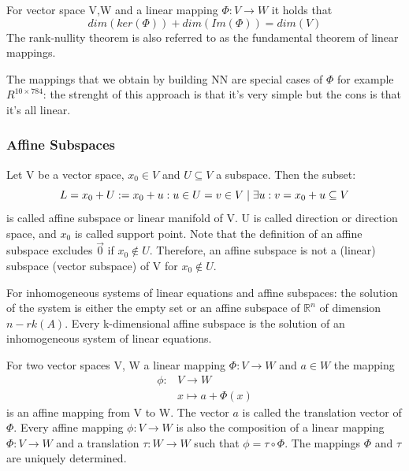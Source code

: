 \begin{theorem}
    For vector space V,W and a linear mapping $ \Phi: V \rightarrow W  $ it holds that \[ 
        dim(ker(\Phi)) + dim(Im(\Phi)) = dim(V)
    \]
    The rank-nullity theorem is also referred to as the fundamental theorem of linear mappings.
\end{theorem}
The mappings that we obtain by building NN are special cases of $ \Phi $ for example $ R^{10\times784} $: the strenght of this approach is that it's very simple but the cons is that it's all linear.
\subsubsection*{Affine Subspaces}
\begin{definition}
    Let V be a vector space, $x_0 \in V$ and $U \subseteq V$ a subspace. Then the subset: \[ 
        L = x_0 + U : = {x_0+u: u\in U} \\
        ={v\in V \mid \exists u : v = x_0 +u} \subseteq V
    \]is called affine subspace or linear manifold of V. U is called direction or direction space, and $x_0$ is called support point. Note that the definition of an affine subspace excludes $\vec{0}$ if $x_0 \notin U$. Therefore, an affine subspace is not a (linear) subspace (vector subspace) of V for $x_0 \notin U$.
\end{definition}
\begin{remark}
    For inhomogeneous systems of linear equations and affine subspaces:
    the solution of the system is either the empty set or an affine subspace of $\mathbb{R}^n$ of dimension $n-rk(A)$. Every k-dimensional affine subspace is the solution of an inhomogeneous system of linear equations. 
\end{remark}
\begin{definition}
    For two vector spaces V, W a linear mapping $\Phi: V \longrightarrow W$ and $a \in W$ the mapping
    \begin{align*}
        \phi: &V \longrightarrow W \\
        &x \mapsto a + \Phi(x)
    \end{align*}
    is an affine mapping from V to W. The vector $a$ is called the translation vector of $\Phi$.
    Every affine mapping $\phi: V \longrightarrow W$ is also the composition of a linear mapping $\Phi: V \longrightarrow W$ and a translation $\tau: W \longrightarrow W$ such that $\phi = \tau \circ \Phi$. The mappings $\Phi$ and $\tau$ are uniquely determined.
\end{definition}
